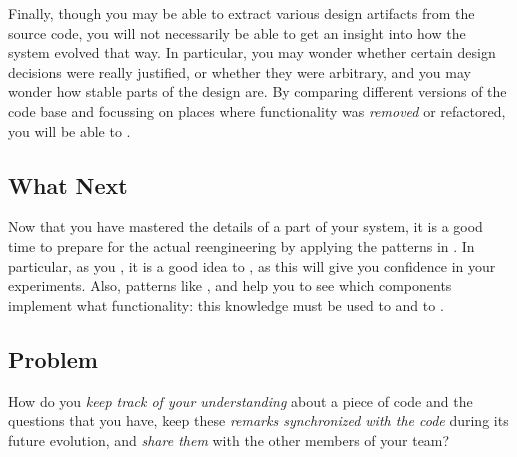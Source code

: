 \documentclass[a4paper,10pt,twoside]{book}
\begin{document}
Finally, though you may be able to extract various design artifacts from the source code, you will not necessarily be able to get an insight into how the system evolved that way. In particular, you may wonder whether certain design decisions were really justified, or whether they were arbitrary, and you may wonder how stable parts of the design are. By comparing different versions of the code base and focussing on places where functionality was \emph{removed} or refactored, you will be able to .

\subsection*{What Next}

Now that you have mastered the details of a part of your system, it is a good time to prepare for the actual reengineering by applying the patterns in . In particular, as you , it is a good idea to , as this will give you confidence in your experiments. Also, patterns like ,  and  help you to see which components implement what functionality: this knowledge must be used to  and to .






\subsection*{Problem}

How do you \emph{keep track of your understanding} about a piece of code and the questions that you have, keep these \emph{remarks synchronized with the code} during its future evolution, and \emph{share them} with the other members of your team? 
\end{document}
